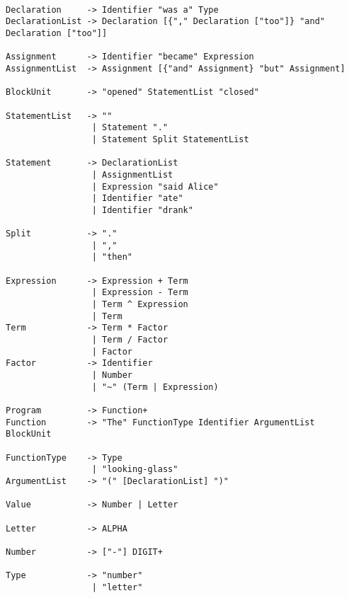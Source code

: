 \documentclass[a4wide, 11pt]{article}
\begin{document}
\begin{verbatim}

Declaration     -> Identifier "was a" Type
DeclarationList -> Declaration [{"," Declaration ["too"]} "and" Declaration ["too"]]

Assignment      -> Identifier "became" Expression
AssignmentList  -> Assignment [{"and" Assignment} "but" Assignment]

BlockUnit       -> "opened" StatementList "closed"

StatementList   -> ""
                 | Statement "."
                 | Statement Split StatementList
               
Statement       -> DeclarationList
                 | AssignmentList
                 | Expression "said Alice"
                 | Identifier "ate"
                 | Identifier "drank"

Split           -> "."
                 | ","
                 | "then"

Expression      -> Expression + Term
                 | Expression - Term
                 | Term ^ Expression
                 | Term
Term            -> Term * Factor
                 | Term / Factor
                 | Factor
Factor          -> Identifier
                 | Number
                 | "~" (Term | Expression)

Program         -> Function+
Function        -> "The" FunctionType Identifier ArgumentList BlockUnit

FunctionType    -> Type
                 | "looking-glass"
ArgumentList    -> "(" [DeclarationList] ")"

Value           -> Number | Letter

Letter          -> ALPHA

Number          -> ["-"] DIGIT+

Type            -> "number"
                 | "letter"

\end{verbatim}
\end{document}
